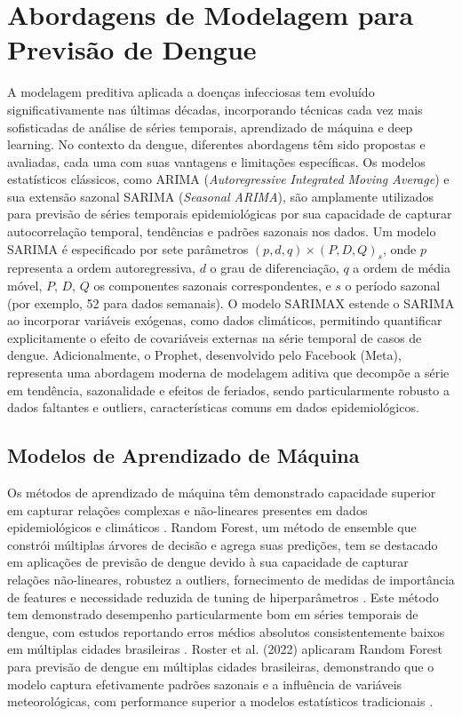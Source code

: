\section{Abordagens de Modelagem para Previsão de Dengue}

A modelagem preditiva aplicada a doenças infecciosas tem evoluído significativamente nas últimas décadas, incorporando técnicas cada vez mais sofisticadas de análise de séries temporais, aprendizado de máquina e deep learning. No contexto da dengue, diferentes abordagens têm sido propostas e avaliadas, cada uma com suas vantagens e limitações específicas. Os modelos estatísticos clássicos, como ARIMA (\textit{Autoregressive Integrated Moving Average}) e sua extensão sazonal SARIMA (\textit{Seasonal ARIMA}), são amplamente utilizados para previsão de séries temporais epidemiológicas por sua capacidade de capturar autocorrelação temporal, tendências e padrões sazonais nos dados. Um modelo SARIMA é especificado por sete parâmetros $(p, d, q) \times (P, D, Q)_s$, onde $p$ representa a ordem autoregressiva, $d$ o grau de diferenciação, $q$ a ordem de média móvel, $P$, $D$, $Q$ os componentes sazonais correspondentes, e $s$ o período sazonal (por exemplo, 52 para dados semanais). O modelo SARIMAX estende o SARIMA ao incorporar variáveis exógenas, como dados climáticos, permitindo quantificar explicitamente o efeito de covariáveis externas na série temporal de casos de dengue. Adicionalmente, o Prophet, desenvolvido pelo Facebook (Meta), representa uma abordagem moderna de modelagem aditiva que decompõe a série em tendência, sazonalidade e efeitos de feriados, sendo particularmente robusto a dados faltantes e outliers, características comuns em dados epidemiológicos.

\subsection{Modelos de Aprendizado de Máquina}

Os métodos de aprendizado de máquina têm demonstrado capacidade superior em capturar relações complexas e não-lineares presentes em dados epidemiológicos e climáticos \cite{roster2022machine,mussumeci2020large}. Random Forest, um método de ensemble que constrói múltiplas árvores de decisão e agrega suas predições, tem se destacado em aplicações de previsão de dengue devido à sua capacidade de capturar relações não-lineares, robustez a outliers, fornecimento de medidas de importância de features e necessidade reduzida de tuning de hiperparâmetros \cite{roster2022machine}. Este método tem demonstrado desempenho particularmente bom em séries temporais de dengue, com estudos reportando erros médios absolutos consistentemente baixos em múltiplas cidades brasileiras \cite{roster2022machine,mussumeci2020large}. Roster et al. (2022) aplicaram Random Forest para previsão de dengue em múltiplas cidades brasileiras, demonstrando que o modelo captura efetivamente padrões sazonais e a influência de variáveis meteorológicas, com performance superior a modelos estatísticos tradicionais \cite{roster2022machine}.


